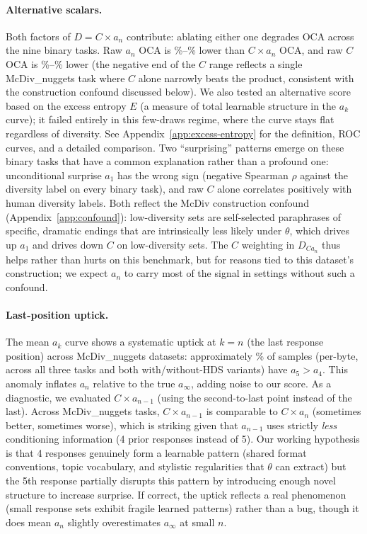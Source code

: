 \paragraph{Alternative scalars.} Both factors of $D = C \times a_n$ contribute: ablating either one degrades OCA across the nine binary tasks. Raw $a_n$ OCA is \tevetAnVsCxAnOCAMinPct\%--\tevetAnVsCxAnOCAMaxPct\% lower than $C \times a_n$ OCA, and raw $C$ OCA is \tevetCVsCxAnOCAMinPct\%--\tevetCVsCxAnOCAMaxPct\% lower (the negative end of the $C$ range reflects a single McDiv\_nuggets task where $C$ alone narrowly beats the product, consistent with the construction confound discussed below).
We also tested an alternative score based on the excess entropy $E$ (a measure of total learnable structure in the $a_k$ curve); it failed entirely in this few-draws regime, where the curve stays flat regardless of diversity.
See Appendix~\ref{app:excess-entropy} for the definition, ROC curves, and a detailed comparison.
Two ``surprising'' patterns emerge on these binary tasks that have a common explanation rather than a profound one: unconditional surprise $a_1$ has the wrong sign (negative Spearman $\rho$ against the diversity label on every binary task), and raw $C$ alone correlates positively with human diversity labels.
Both reflect the McDiv construction confound (Appendix~\ref{app:confound}): low-diversity sets are self-selected paraphrases of specific, dramatic endings that are intrinsically less likely under $\theta$, which drives up $a_1$ and drives down $C$ on low-diversity sets.
The $C$ weighting in $D_{Ca_n}$ thus helps rather than hurts on this benchmark, but for reasons tied to this dataset's construction; we expect $a_n$ to carry most of the signal in settings without such a confound.

\paragraph{Last-position uptick.} The mean $a_k$ curve shows a systematic uptick at $k = n$ (the last response position) across McDiv\_nuggets datasets: approximately \tevetLastUptickPct\% of samples (per-byte, across all three tasks and both with/without-HDS variants) have $a_5 > a_4$.
This anomaly inflates $a_n$ relative to the true $a_\infty$, adding noise to our score.
As a diagnostic, we evaluated $C \times a_{n-1}$ (using the second-to-last point instead of the last).
Across McDiv\_nuggets tasks, $C \times a_{n-1}$ is comparable to $C \times a_n$ (sometimes better, sometimes worse), which is striking given that $a_{n-1}$ uses strictly \emph{less} conditioning information (4 prior responses instead of 5).
Our working hypothesis is that 4 responses genuinely form a learnable pattern (shared format conventions, topic vocabulary, and stylistic regularities that $\theta$ can extract) but the 5th response partially disrupts this pattern by introducing enough novel structure to increase surprise.
If correct, the uptick reflects a real phenomenon (small response sets exhibit fragile learned patterns) rather than a bug, though it does mean $a_n$ slightly overestimates $a_\infty$ at small $n$.

